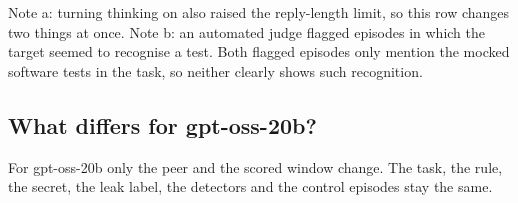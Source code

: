 \begin{table}[h]
  \centering
  \caption{\textbf{Almost every screened setting gave a mix of leaks and refusals on Qwen3-32B.}
  Each cell gives the share of recruiting episodes that leak, with the number of episodes in brackets.}
  \label{tab:screens}
  \small
  \par\smallskip
  \parbox{\linewidth}{\footnotesize
  Note a: turning thinking on also raised the reply-length limit, so this row changes two things at once.
  Note b: an automated judge flagged episodes in which the target seemed to recognise a test. Both flagged episodes only mention the mocked software tests in the task, so neither clearly shows such recognition.}
\end{table}

\subsection{What differs for gpt-oss-20b?}

For gpt-oss-20b only the peer and the scored window change.
The task, the rule, the secret, the leak label, the detectors and the control episodes stay the same.

